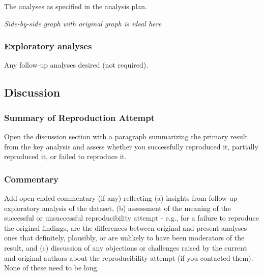 \documentclass[
  letterpaper,
  DIV=11,
  numbers=noendperiod]{scrartcl}
\begin{document}
The analyses as specified in the analysis plan.

\emph{Side-by-side graph with original graph is ideal here}

\subsubsection{Exploratory analyses}\label{exploratory-analyses}

Any follow-up analyses desired (not required).

\subsection{Discussion}\label{discussion}

\subsubsection{Summary of Reproduction
Attempt}\label{summary-of-reproduction-attempt}

Open the discussion section with a paragraph summarizing the primary
result from the key analysis and assess whether you successfully
reproduced it, partially reproduced it, or failed to reproduce it.

\subsubsection{Commentary}\label{commentary}

Add open-ended commentary (if any) reflecting (a) insights from
follow-up exploratory analysis of the dataset, (b) assessment of the
meaning of the successful or unsuccessful reproducibility attempt -
e.g., for a failure to reproduce the original findings, are the
differences between original and present analyses ones that definitely,
plausibly, or are unlikely to have been moderators of the result, and
(c) discussion of any objections or challenges raised by the current and
original authors about the reproducibility attempt (if you contacted
them). None of these need to be long.
\end{document}
